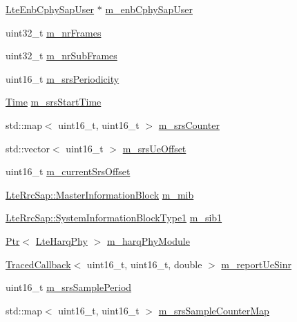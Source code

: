 \begin{DoxyCompactItemize}
\item 
\hyperlink{classns3_1_1LteEnbCphySapUser}{Lte\+Enb\+Cphy\+Sap\+User} $\ast$ \hyperlink{classns3_1_1LteEnbPhy_ad7c71cecaf12b07cad7aebadacb88ecb}{m\+\_\+enb\+Cphy\+Sap\+User}
\item 
uint32\+\_\+t \hyperlink{classns3_1_1LteEnbPhy_ae8464d0dff85be592774739e81f28942}{m\+\_\+nr\+Frames}
\item 
uint32\+\_\+t \hyperlink{classns3_1_1LteEnbPhy_a21c4d540ccd4813df02001a5e0159a35}{m\+\_\+nr\+Sub\+Frames}
\item 
uint16\+\_\+t \hyperlink{classns3_1_1LteEnbPhy_a00aa262d5518685d154da3631cc03670}{m\+\_\+srs\+Periodicity}
\item 
\hyperlink{classns3_1_1Time}{Time} \hyperlink{classns3_1_1LteEnbPhy_a019eaaa6cca7396f9b89fdb5125713e9}{m\+\_\+srs\+Start\+Time}
\item 
std\+::map$<$ uint16\+\_\+t, uint16\+\_\+t $>$ \hyperlink{classns3_1_1LteEnbPhy_af30597488cea3c071d5de05fb357bc98}{m\+\_\+srs\+Counter}
\item 
std\+::vector$<$ uint16\+\_\+t $>$ \hyperlink{classns3_1_1LteEnbPhy_aed120277d3a531a9ccfe9c69cf1636fb}{m\+\_\+srs\+Ue\+Offset}
\item 
uint16\+\_\+t \hyperlink{classns3_1_1LteEnbPhy_a8356f950997d27723f4997ddb797e589}{m\+\_\+current\+Srs\+Offset}
\item 
\hyperlink{structns3_1_1LteRrcSap_1_1MasterInformationBlock}{Lte\+Rrc\+Sap\+::\+Master\+Information\+Block} \hyperlink{classns3_1_1LteEnbPhy_aa6c529e0bc2b61c26ea10cafae1afe18}{m\+\_\+mib}
\item 
\hyperlink{structns3_1_1LteRrcSap_1_1SystemInformationBlockType1}{Lte\+Rrc\+Sap\+::\+System\+Information\+Block\+Type1} \hyperlink{classns3_1_1LteEnbPhy_ac5495a4ef3c8576b2f0a2c2cffdcf2aa}{m\+\_\+sib1}
\item 
\hyperlink{classns3_1_1Ptr}{Ptr}$<$ \hyperlink{classns3_1_1LteHarqPhy}{Lte\+Harq\+Phy} $>$ \hyperlink{classns3_1_1LteEnbPhy_af1e6a57f81f6fcc0f670aa81131447ce}{m\+\_\+harq\+Phy\+Module}
\item 
\hyperlink{classns3_1_1TracedCallback}{Traced\+Callback}$<$ uint16\+\_\+t, uint16\+\_\+t, double $>$ \hyperlink{classns3_1_1LteEnbPhy_a97d34e9ba36db6eb607a40c239dd408e}{m\+\_\+report\+Ue\+Sinr}
\item 
uint16\+\_\+t \hyperlink{classns3_1_1LteEnbPhy_a16c1df8f3a289036ffc98042e9b47094}{m\+\_\+srs\+Sample\+Period}
\item 
std\+::map$<$ uint16\+\_\+t, uint16\+\_\+t $>$ \hyperlink{classns3_1_1LteEnbPhy_aaafd624cc9ea841044feddc32c0e3ab5}{m\+\_\+srs\+Sample\+Counter\+Map}

\end{DoxyCompactItemize}
